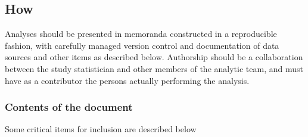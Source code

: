 \documentclass[]{book}
\begin{document}
\subsection{How}\label{how-4}

Analyses should be presented in memoranda constructed in a reproducible
fashion, with carefully managed version control and documentation of
data sources and other items as described below. Authorship should be a
collaboration between the study statistician and other members of the
analytic team, and must have as a contributor the persons actually
performing the analysis.

\hypertarget{contents-of-the-document-1}{\subsubsection{Contents of the
document}\label{contents-of-the-document-1}}

Some critical items for inclusion are described below
\end{document}
